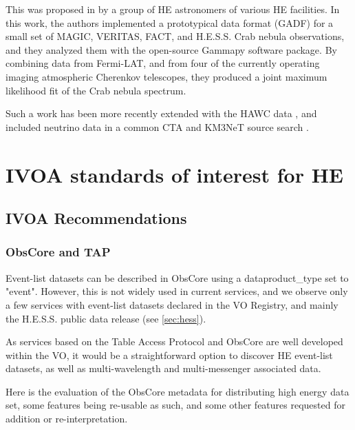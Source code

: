 \documentclass[11pt,a4paper]{ivoa}
\begin{document}
This was proposed in \citep{2019A&A...625A..10N} by a group of HE astronomers of various HE facilities.
In this work, the authors implemented a prototypical data format (GADF) for a small set of MAGIC, VERITAS, FACT, and H.E.S.S. Crab nebula observations, and they analyzed them with the open-source Gammapy software package. By combining data from Fermi-LAT, and from four of the currently operating imaging atmospheric Cherenkov telescopes, they produced a joint maximum likelihood fit of the Crab nebula spectrum.

Such a work has been more recently extended with the HAWC data \citep{2022A&A...667A..36A}, and included neutrino data in a common CTA and KM3NeT source search \citep{unbehaun2023prospects}.


\section{IVOA standards of interest for HE}

\subsection{IVOA Recommendations}

\subsubsection{ObsCore and TAP}

Event-list datasets can be described in ObsCore using a dataproduct\_type set to "event". However, this is not widely used in current services, and we observe only a few services with event-list datasets declared in the VO Registry, and mainly the H.E.S.S. public data release (see \ref{sec:hess}).

As services based on the Table Access Protocol \citep{2019ivoa.spec.0927D} and ObsCore are well developed within the VO, it would be a straightforward option to discover HE event-list datasets, as well as multi-wavelength and multi-messenger associated data.

Here is the evaluation of the ObsCore metadata for distributing high energy data set, some features being re-usable as such, and some other features requested for addition or re-interpretation.
\end{document}
